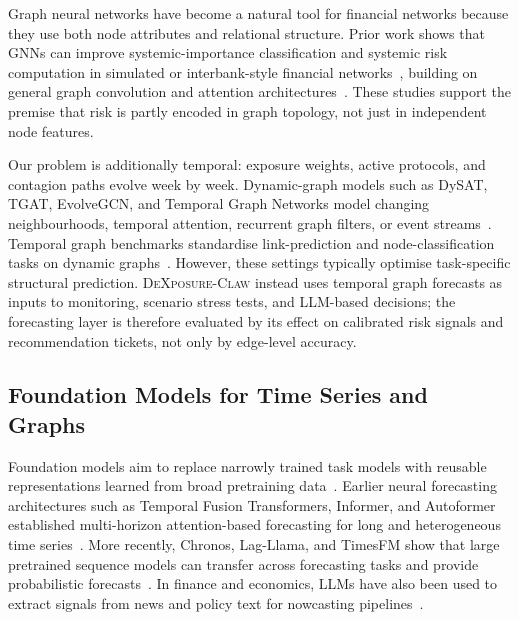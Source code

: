 Graph neural networks have become a natural tool for financial networks
because they use both node attributes and relational structure. Prior work
shows that GNNs can improve systemic-importance classification and systemic
risk computation in simulated or interbank-style financial
networks~\cite{BALMASEDA2023200240,gonon2025computingsystemicriskmeasures},
building on general graph convolution and attention
architectures~\cite{KipfWelling2017,veličković2018graphattentionnetworks}.
These studies support the premise that risk is partly encoded in graph
topology, not just in independent node features.

Our problem is additionally temporal: exposure weights, active protocols, and
contagion paths evolve week by week. Dynamic-graph models such as DySAT,
TGAT, EvolveGCN, and Temporal Graph Networks model changing neighbourhoods,
temporal attention, recurrent graph filters, or event streams~\cite{
SankarEtAl2020DySAT,XuEtAl2020TGAT,ParejaEtAl2020EvolveGCN,
rossi2020temporalgraphnetworksdeep}. Temporal graph benchmarks standardise
link-prediction and node-classification tasks on dynamic
graphs~\cite{huang2023tgb}. However, these settings typically optimise
task-specific structural prediction. \textsc{DeXposure-Claw} instead uses
temporal graph forecasts as inputs to monitoring, scenario stress tests, and
LLM-based decisions; the forecasting layer is therefore evaluated by its
effect on calibrated risk signals and recommendation tickets, not only by
edge-level accuracy.

\subsection{Foundation Models for Time Series and Graphs}

Foundation models aim to replace narrowly trained task models with reusable
representations learned from broad pretraining data~\cite{
BommasaniEtAl2021FoundationModels}. Earlier neural forecasting architectures
such as Temporal Fusion Transformers, Informer, and Autoformer established
multi-horizon attention-based forecasting for long and heterogeneous time
series~\cite{LimEtAl2021TFT,ZhouEtAl2021Informer,WuEtAl2021Autoformer}. More
recently, Chronos, Lag-Llama, and TimesFM show that large pretrained sequence
models can transfer across forecasting tasks and provide probabilistic
forecasts~\cite{AnsariEtAl2024Chronos,RasulEtAl2023LagLlama,
DasEtAl2024TimesFM}. In finance and economics, LLMs have also been used to
extract signals from news and policy text for nowcasting pipelines~\cite{
deBondtSun2025ChatGPTNowcast,KwonEtAl2024BISLLMprimer,CarrieroEtAl2024MacroLLM}.

